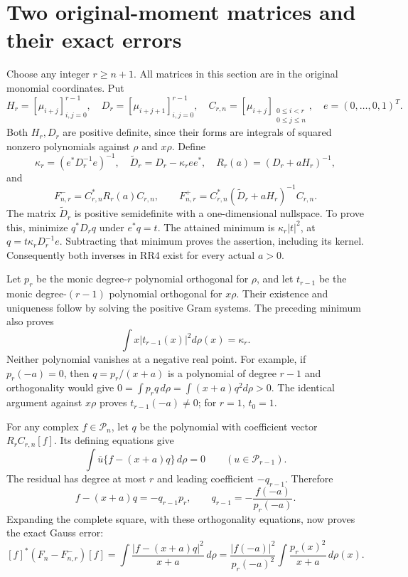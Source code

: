 \documentclass[11pt]{article}
\begin{document}
\section{Two original-moment matrices and their exact errors}
Choose any integer $r\ge n+1$. All matrices in this section are in
the original monomial coordinates. Put
\[
 H_r=[\mu_{i+j}]_{i,j=0}^{r-1},\quad
 D_r=[\mu_{i+j+1}]_{i,j=0}^{r-1},\quad
 C_{r,n}=[\mu_{i+j}]_{\substack{0\le i<r\\0\le j\le n}},
 \quad e=(0,\ldots,0,1)^T.
\]
Both $H_r,D_r$ are positive definite, since their forms are integrals
of squared nonzero polynomials against $\rho$ and $x\rho$.
Define
\begin{equation}\tag{RR3}\label{eq:forms}
 \kappa_r=(e^*D_r^{-1}e)^{-1},\quad
 \widetilde D_r=D_r-\kappa_ree^*,\quad R_r(a)=(D_r+aH_r)^{-1},
\end{equation}
and
\begin{equation}\tag{RR4}\label{eq:bounds}
 F^-_{n,r}=C_{r,n}^*R_r(a)C_{r,n},\qquad
 F^+_{n,r}=C_{r,n}^*(\widetilde D_r+aH_r)^{-1}C_{r,n}.
\end{equation}
The matrix $\widetilde D_r$ is positive semidefinite with a
one-dimensional nullspace. To prove this, minimize $q^*D_rq$ under
$e^*q=t$. The attained minimum is $\kappa_r|t|^2$, at
$q=t\kappa_rD_r^{-1}e$. Subtracting that minimum proves the
assertion, including its kernel. Consequently both inverses in RR4
exist for every actual $a>0$.

Let $p_r$ be the monic degree-$r$ polynomial orthogonal for $\rho$,
and let $t_{r-1}$ be the monic degree-$(r-1)$ polynomial orthogonal
for $x\rho$. Their existence and uniqueness follow by solving the
positive Gram systems. The preceding minimum also proves
\begin{equation}\tag{RR5}\label{eq:kappa}
 \int x|t_{r-1}(x)|^2d\rho(x)=\kappa_r.
\end{equation}
Neither polynomial vanishes at a negative real point. For example,
if $p_r(-a)=0$, then $q=p_r/(x+a)$ is a polynomial of degree $r-1$
and orthogonality would give
$0=\int p_rq\,d\rho=\int(x+a)q^2d\rho>0$.
The identical argument against $x\rho$ proves $t_{r-1}(-a)\ne0$;
for $r=1$, $t_0=1$.

For any complex $f\in\mathcal P_n$, let $q$ be the polynomial with
coefficient vector $R_rC_{r,n}[f]$. Its defining equations give
\[
 \int\overline u\{f-(x+a)q\}\,d\rho=0\qquad(u\in\mathcal P_{r-1}).
\]
The residual has degree at most $r$ and leading coefficient $-q_{r-1}$.
Therefore
\[
 f-(x+a)q=-q_{r-1}p_r,
 \qquad q_{r-1}=-\frac{f(-a)}{p_r(-a)}.
\]
Expanding the complete square, with these orthogonality equations,
now proves the exact Gauss error:
\begin{equation}\tag{RR6}\label{eq:GaussError}
 [f]^*(F_n-F^-_{n,r})[f]
 =\int\frac{|f-(x+a)q|^2}{x+a}\,d\rho
 =\frac{|f(-a)|^2}{p_r(-a)^2}
              \int\frac{p_r(x)^2}{x+a}\,d\rho(x).
\end{equation}
\end{document}
